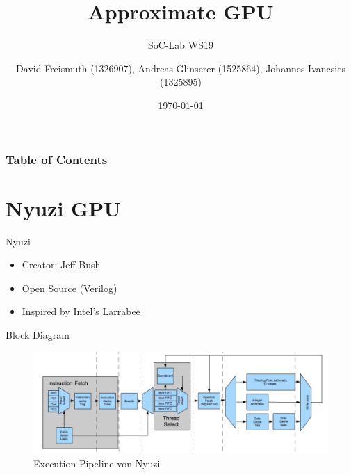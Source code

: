 \documentclass{beamer}
\title[Approximate GPU] %
{Approximate GPU}
\subtitle{SoC-Lab WS19}
\author[David Freismuth (1326907), Andreas Glinserer (1525864), \\
Johannes Ivancsics (1325895)] %
{David Freismuth (1326907), Andreas Glinserer (1525864), Johannes Ivancsics (1325895)}
\date[\today] %
{\today}
\begin{document}
\frame{\titlepage}


\begin{frame}
\frametitle{Table of Contents}
\tableofcontents
\end{frame}

\section{Nyuzi GPU}
\begin{frame}{Nyuzi}
    \begin{itemize}
        \item<1-> Creator: Jeff Bush \cite{Nyuzi}
        \item<2-> Open Source (Verilog)
        \item<3-> Inspired by Intel's Larrabee \cite{Seiler:2008:LMX:1360612.1360617}
    \end{itemize}
\end{frame}
\begin{frame}{Block Diagram}
    \begin{figure}
        \includegraphics[width=\linewidth]{nyuzi-execute-pipeline}
        \caption{Execution Pipeline von Nyuzi}
    \end{figure}
\end{frame}
\end{document}
